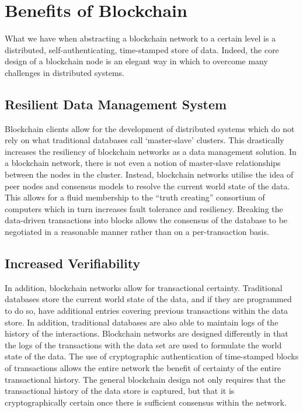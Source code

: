 \section{Benefits of Blockchain}
What we have when abstracting a blockchain network to a certain level is a distributed, self-authenticating, time-stamped store of data\cite{MonaxBlockchains}. Indeed, the core design of a blockchain node is an elegant way in which to overcome many challenges in distributed systems.
\subsection{Resilient Data Management System}
Blockchain clients allow for the development of distributed systems which do not rely on what traditional databases call ‘master-slave’ clusters. This drastically increases the resiliency of blockchain networks as a data management solution.
In a blockchain network, there is not even a notion of master-slave relationships between the nodes in the cluster. Instead, blockchain networks utilise the idea of peer nodes and consensus models to resolve the current world state of the data.
This allows for a fluid membership to the “truth creating” consortium of computers which in turn increases fault tolerance and resiliency. Breaking the data-driven transactions into blocks allows the consensus of the database to be negotiated in a reasonable manner rather than on a per-transaction basis.
\subsection{Increased Verifiability}
In addition, blockchain networks allow for transactional certainty. Traditional databases store the current world state of the data, and if they are programmed to do so, have additional entries covering previous transactions within the data store. In addition, traditional databases are also able to maintain logs of the history of the interactions.
Blockchain networks are designed differently in that the logs of the transactions with the data set are used to formulate the world state of the data. The use of cryptographic authentication of time-stamped blocks of transactions allows the entire network the benefit of certainty of the entire transactional history.
The general blockchain design not only requires that the transactional history of the data store is captured, but that it is cryptographically certain once there is sufficient consensus within the network.

